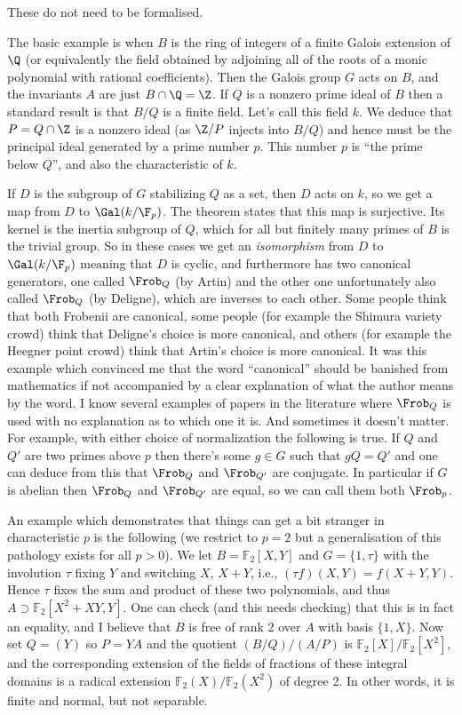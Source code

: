 These do not need to be formalised.

The basic example is when $B$ is the ring of integers of a finite Galois extension of $\Q$
(or equivalently the field obtained by adjoining all of the roots of
a monic polynomial with rational coefficients).
Then the Galois group $G$ acts on $B$, and the invariants $A$ are just $B\cap\Q=\Z$. If $Q$
is a nonzero prime ideal of $B$ then a standard result is that $B/Q$ is a finite field. Let's
call this field $k$. We deduce that $P=Q\cap \Z$ is a nonzero ideal (as $\Z/P$ injects into $B/Q$)
and hence must be
the principal ideal generated by a prime number $p$. This number $p$ is ``the prime below $Q$'',
and also the characteristic of $k$.

If $D$ is the subgroup of $G$ stabilizing $Q$ as a set, then $D$ acts on $k$, so we get
a map from $D$ to $\Gal(k/\F_p)$. The theorem states that this map is surjective.
Its kernel is the inertia subgroup of $Q$, which for all but finitely many primes of $B$
is the trivial group. So in these cases we get an \emph{isomorphism} from $D$ to $\Gal(k/\F_p)$
meaning that $D$ is cyclic, and furthermore has two canonical generators, one called $\Frob_Q$
(by Artin) and the other one unfortunately also called $\Frob_Q$ (by Deligne), which are inverses
to each other. Some people think that both Frobenii are canonical, some people (for example
the Shimura variety crowd) think that Deligne's choice is more canonical, and others
(for example the Heegner point crowd) think that Artin's choice is more canonical.
It was this example which convinced me that the word ``canonical'' should be banished
from mathematics if not accompanied by a clear explanation of what the author means
by the word. I know several examples of papers in the literature where $\Frob_Q$ is
used with no explanation as to which one it is. And sometimes it doesn't matter.
For example, with either choice of normalization the following is true.
If $Q$ and $Q'$ are two primes above $p$ then there's some $g\in G$ such that
$gQ=Q'$ and one can deduce from this that $\Frob_Q$ and $\Frob_{Q'}$ are conjugate. In particular
if $G$ is abelian then $\Frob_Q$ and $\Frob_{Q'}$ are equal, so we can call them both $\Frob_p$.

An example which demonstrates that things can get a bit stranger in characteristic $p$ is the
following (we restrict to $p=2$ but a generalisation of this pathology exists for all $p>0$).
We let $B=\mathbb{F}_2[X,Y]$ and $G=\{1,\tau\}$ with the involution $\tau$
fixing $Y$ and switching $X$, $X+Y$, i.e., $(\tau f)(X,Y)=f(X+Y, Y)$.
Hence $\tau$ fixes the sum and product of these two polynomials, and thus
$A\supset \mathbb{F}_2[X^2+XY,Y]$. One can check (and this needs checking) that this
is in fact an equality, and I believe that $B$ is free of
rank 2 over $A$ with basis $\{1,X\}$.
Now set $Q=(Y)$ so $P=YA$ and the quotient $(B/Q)/(A/P)$ is
$\mathbb{F}_2[X]/\mathbb{F}_2[X^2]$, and the corresponding extension
of the fields of fractions of these integral domains is a radical extension
$\mathbb{F}_2(X)/\mathbb{F}_2(X^2)$ of degree 2.
In other words, it is finite and normal, but not separable.

